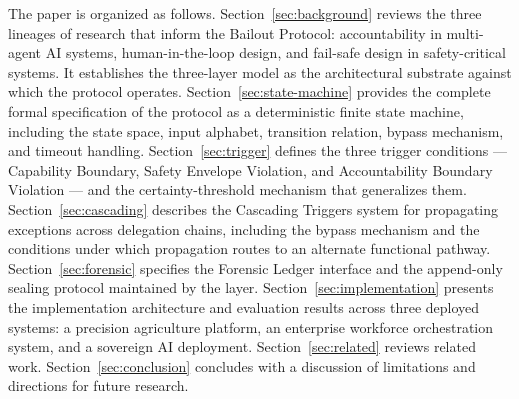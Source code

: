 The paper is organized as follows. Section~\ref{sec:background} reviews the three lineages of research that inform the Bailout Protocol: accountability in multi-agent AI systems, human-in-the-loop design, and fail-safe design in safety-critical systems. It establishes the \bxthree{} three-layer model as the architectural substrate against which the protocol operates. Section~\ref{sec:state-machine} provides the complete formal specification of the protocol as a deterministic finite state machine, including the state space, input alphabet, transition relation, bypass mechanism, and timeout handling. Section~\ref{sec:trigger} defines the three trigger conditions — Capability Boundary, Safety Envelope Violation, and Accountability Boundary Violation — and the certainty-threshold mechanism that generalizes them. Section~\ref{sec:cascading} describes the Cascading Triggers system for propagating exceptions across delegation chains, including the bypass mechanism and the conditions under which propagation routes to an alternate functional pathway. Section~\ref{sec:forensic} specifies the Forensic Ledger interface and the append-only sealing protocol maintained by the \fact{} layer. Section~\ref{sec:implementation} presents the implementation architecture and evaluation results across three deployed systems: a precision agriculture platform, an enterprise workforce orchestration system, and a sovereign AI deployment. Section~\ref{sec:related} reviews related work. Section~\ref{sec:conclusion} concludes with a discussion of limitations and directions for future research.
